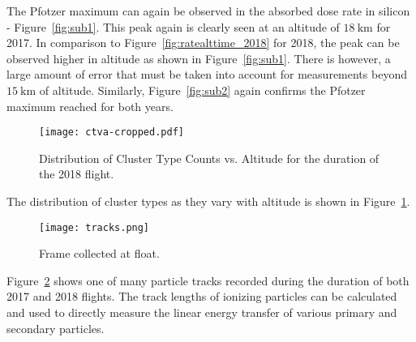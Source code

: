 The Pfotzer maximum can again be observed in the absorbed dose rate in silicon - Figure~\ref{fig:sub1}.  This peak again is clearly seen at an altitude of $\SI{18}{\kilo\meter}$ for 2017.  In comparison to Figure~\ref{fig:ratealttime_2018} for 2018, the peak can be observed higher in altitude as shown in Figure~\ref{fig:sub1}.  There is however, a large amount of error that must be taken into account for measurements beyond $\SI{15}{\kilo\meter}$ of altitude. 
Similarly, Figure~\ref{fig:sub2} again confirms the Pfotzer maximum reached for both years.
\begin{figure}[H]
\centering
\texttt{[image: ctva-cropped.pdf]}
\caption{Distribution of Cluster Type Counts vs. Altitude for the duration of the 2018 flight.}
\label{fig:cluster2018}
\end{figure}
The distribution of cluster types as they vary with altitude is shown in Figure~\ref{fig:cluster2018}.  
\begin{figure}[H]
\centering
\texttt{[image: tracks.png]}
\caption{Frame collected at float.}
\label{fig:frame1}
\end{figure}
Figure~\ref{fig:frame1} shows one of many particle tracks recorded during the duration of both 2017 and 2018 flights.  The track lengths of ionizing particles can be calculated and used to directly measure the linear energy transfer of various primary and secondary particles.


